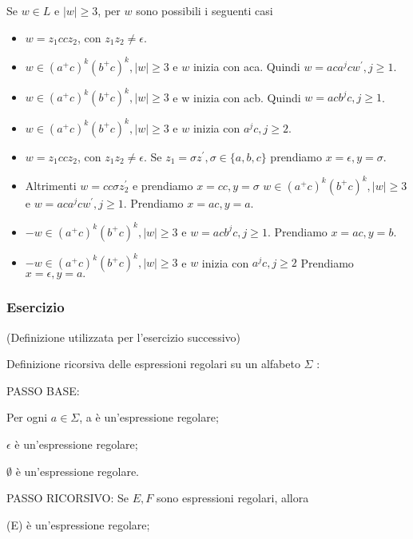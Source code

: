 Se $w \in L$ e $|w| \geq 3$, per $w$ sono possibili i seguenti casi
\begin{itemize}
    \item $w=z_{1} c c z_{2}$, con $z_{1} z_{2} \neq \epsilon$.
    \item $w \in\left(a^{+} c\right)^{k}\left(b^{+} c\right)^{k},|w| \geq 3$ e $w$ inizia con aca. Quindi $w=a c a^{j} c w^{\prime}, j \geq 1$.
    \item  $w \in\left(a^{+} c\right)^{k}\left(b^{+} c\right)^{k},|w| \geq 3$ e w inizia con acb. Quindi $w=a c b^{j} c, j \geq 1$.
    \item $w \in\left(a^{+} c\right)^{k}\left(b^{+} c\right)^{k},|w| \geq 3$ e $w$ inizia con $a^{j} c, j \geq 2$.
    \item $w=z_{1} c c z_{2}$, con $z_{1} z_{2} \neq \epsilon .$ Se $z_{1}=\sigma z^{\prime}, \sigma \in\{a, b, c\}$
prendiamo $x=\epsilon, y=\sigma .$
    \item Altrimenti $w=c c \sigma z_{2}^{\prime}$ e prendiamo $x=c c, y=\sigma$
$w \in\left(a^{+} c\right)^{k}\left(b^{+} c\right)^{k},|w| \geq 3$ e $w=a c a^{j} c w^{\prime}, j \geq 1$. Prendiamo
$x=a c, y=a .$
    \item $-w \in\left(a^{+} c\right)^{k}\left(b^{+} c\right)^{k},|w| \geq 3$ e $w=a c b^{j} c, j \geq 1$. Prendiamo
$x=a c, y=b .$
    \item $-w \in\left(a^{+} c\right)^{k}\left(b^{+} c\right)^{k},|w| \geq 3$ e $w$ inizia con $a^{j} c, j \geq 2$
Prendiamo $x=\epsilon, y=a .$
\end{itemize}

\subsubsection{Esercizio}

(Definizione utilizzata per l'esercizio successivo)

Definizione ricorsiva delle espressioni regolari su un alfabeto $\Sigma$ :

PASSO BASE:

Per ogni $a \in \Sigma$, a è un'espressione regolare;

$\epsilon$ è un'espressione regolare;

$\emptyset$ è un'espressione regolare.

\vspace{5mm}

PASSO RICORSIVO: Se $E, F$ sono espressioni regolari, allora

(E) è un'espressione regolare;

